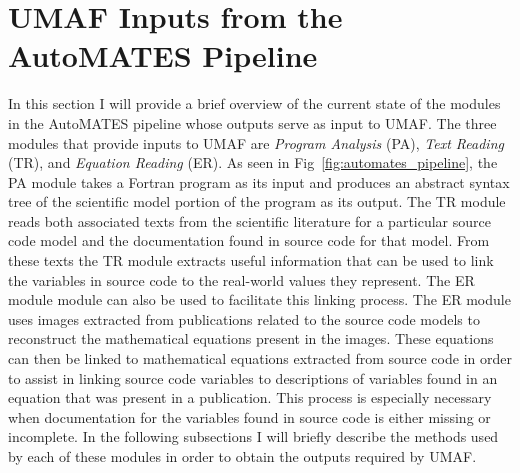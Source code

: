 \section{UMAF Inputs from the AutoMATES Pipeline\label{sec:umaf_inputs}}
In this section I will provide a brief overview of the current state of the modules in the AutoMATES pipeline whose outputs serve as input to UMAF.
The three modules that provide inputs to UMAF are \textit{Program Analysis} (PA), \textit{Text Reading} (TR), and \textit{Equation Reading} (ER). As seen in Fig~\ref{fig:automates_pipeline}, the PA module takes a Fortran program as its input and produces an abstract syntax tree of the scientific model portion of the program as its output.
The TR module reads both associated texts from the scientific literature for a particular source code model and the documentation found in source code for that model.
From these texts the TR module extracts useful information that can be used to link the variables in source code to the real-world values they represent.
The ER module module can also be used to facilitate this linking process.
The ER module uses images extracted from publications related to the source code models to reconstruct the mathematical equations present in the images.
These equations can then be linked to mathematical equations extracted from source code in order to assist in linking source code variables to descriptions of variables found in an equation that was present in a publication.
This process is especially necessary when documentation for the variables found in source code is either missing or incomplete.
In the following subsections I will briefly describe the methods used by each of these modules in order to obtain the outputs required by UMAF.

